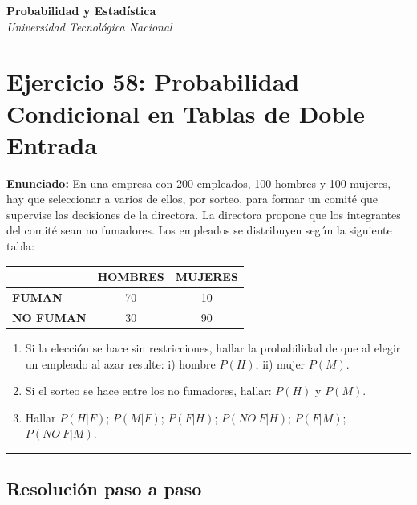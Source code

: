 \documentclass[11pt,a4paper]{article}
\begin{document}
\begin{center}
    \textbf{\Large Probabilidad y Estadística} \\
    \vspace{0.2cm}
    \textit{Universidad Tecnológica Nacional}
\end{center}

\vspace{0.5cm}

\section*{Ejercicio 58: Probabilidad Condicional en Tablas de Doble Entrada}

\textbf{Enunciado:} En una empresa con 200 empleados, 100 hombres y 100 mujeres, hay que seleccionar a varios de ellos, por sorteo, para formar un comité que supervise las decisiones de la directora. La directora propone que los integrantes del comité sean no fumadores. Los empleados se distribuyen según la siguiente tabla:

\begin{center}
\begin{tabular}{lcc}
\toprule
 & \textbf{HOMBRES} & \textbf{MUJERES} \\
\midrule
\textbf{FUMAN} & 70 & 10 \\
\textbf{NO FUMAN} & 30 & 90 \\
\bottomrule
\end{tabular}
\end{center}

\begin{enumerate}[label=\alph*.]
    \item Si la elección se hace sin restricciones, hallar la probabilidad de que al elegir un empleado al azar resulte: i) hombre $P(H)$, ii) mujer $P(M)$.
    \item Si el sorteo se hace entre los no fumadores, hallar: $P(H)$ y $P(M)$.
    \item Hallar $P(H|F)$; $P(M|F)$; $P(F|H)$; $P(NO \ F|H)$; $P(F|M)$; $P(NO \ F|M)$.
\end{enumerate}

\vspace{0.5cm}
\hrule
\vspace{0.5cm}

\subsection*{Resolución paso a paso}
\end{document}
